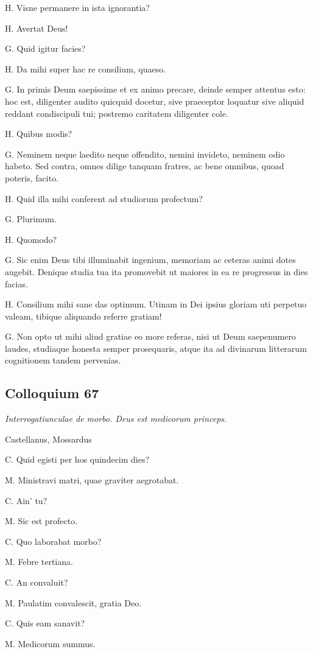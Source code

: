 \documentclass{article}
\begin{document}
H. Visne permanere in ista ignorantia?

H. Avertat Deus!

G. Quid igitur facies?

H. Da mihi super hac re consilium, quaeso. 

G. In primis Deum saepissime et ex animo precare, deinde semper attentus esto: hoc est, diligenter audito quicquid docetur, sive praeceptor loquatur sive aliquid reddant condiscipuli tui; postremo caritatem diligenter cole. 

H. Quibus modis?

G. Neminem neque laedito neque offendito, nemini invideto, neminem odio habeto. Sed contra, omnes dilige tanquam fratres, ac bene omnibus, quoad poteris, facito. 

H. Quid illa mihi conferent ad studiorum profectum?

G. Plurimum. 

H. Quomodo?

G. Sic enim Deus tibi illuminabit ingenium, memoriam ac ceteras animi dotes augebit. Denique studia tua ita promovebit ut maiores in ea re progressus in dies facias. 

H. Consilium mihi sane das optimum. Utinam in Dei ipsius gloriam uti perpetuo valeam, tibique aliquando referre gratiam!

G. Non opto ut mihi aliud gratiae eo more referas, nisi ut Deum saepenumero laudes, studiaque honesta semper prosequaris, atque ita ad divinarum litterarum cognitionem tandem pervenias.

\subsection{Colloquium 67}
\emph{Interrogatiunculae de morbo. Deus est medicorum princeps.}

Castellanus, Mossardus

C. Quid egisti per hos quindecim dies?

M. Ministravi matri, quae graviter aegrotabat. 

C. Ain' tu?

M. Sic est profecto. 

C. Quo laborabat morbo?

M. Febre tertiana. 

C. An convaluit?

M. Paulatim convalescit, gratia Deo.
 
C. Quis eam sanavit?

M. Medicorum summus. 
\end{document}
